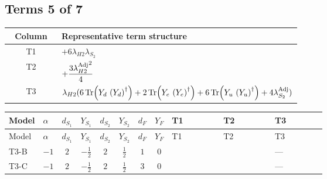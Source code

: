 \documentclass[8pt]{article}
\begin{document}
\begin{landscape}
\subsection*{Terms 5 of 7}
\begin{center}
\begin{tabular}{@{}c >{\raggedright\arraybackslash}p{0.82\linewidth}@{}}
\toprule
Column & Representative term structure \\
\midrule
T1 & \(\displaystyle +6 {\lambda_{H2}} {\lambda_{S_2}}\) \\
\midrule
T2 & \(\displaystyle +\frac{3 {\lambda_{H2}^{\rm Adj}}^2}{4}\) \\
\midrule
T3 & \(\displaystyle {\lambda_{H2}} (6 \operatorname{Tr}\!\left({Y_d}\,\left({Y_d}\right)^{\dagger}\right)+2 \operatorname{Tr}\!\left({Y_e}\,\left({Y_e}\right)^{\dagger}\right)+6 \operatorname{Tr}\!\left({Y_u}\,\left({Y_u}\right)^{\dagger}\right)+4 {\lambda_{S_2}^{\rm Adj}})\) \\
\midrule
\bottomrule
\end{tabular}
\end{center}
\smallskip
\tiny
\begin{longtable}{@{}llcccccc >{\raggedright\arraybackslash}p{0.21\linewidth} >{\raggedright\arraybackslash}p{0.21\linewidth} >{\raggedright\arraybackslash}p{0.21\linewidth}@{}}
\toprule
Model & $\alpha$ & $d_{S_1}$ & $Y_{S_1}$ & $d_{S_2}$ & $Y_{S_2}$ & $d_F$ & $Y_F$ & T1 & T2 & T3 \\
\midrule
\endfirsthead
\toprule
Model & $\alpha$ & $d_{S_1}$ & $Y_{S_1}$ & $d_{S_2}$ & $Y_{S_2}$ & $d_F$ & $Y_F$ & T1 & T2 & T3 \\
\midrule
\endhead
T3-B & $-1$ & $2$ & $-\frac{1}{2}$ & $2$ & $\frac{1}{2}$ & $1$ & $0$ & \scriptsize\adjustbox{max width=\linewidth}{$\begin{gathered} +6 {\lambda_{H2}} {\lambda_{S_2}}\end{gathered}$} & \scriptsize\adjustbox{max width=\linewidth}{$\begin{gathered} +\frac{3 {\lambda_{H2}^{\rm Adj}}^2}{4}\end{gathered}$} & --- \\
\midrule
T3-C & $-1$ & $2$ & $-\frac{1}{2}$ & $2$ & $\frac{1}{2}$ & $3$ & $0$ & \scriptsize\adjustbox{max width=\linewidth}{$\begin{gathered} +6 {\lambda_{H2}} {\lambda_{S_2}}\end{gathered}$} & \scriptsize\adjustbox{max width=\linewidth}{$\begin{gathered} +\frac{3 {\lambda_{H2}^{\rm Adj}}^2}{4}\end{gathered}$} & --- \\

\end{longtable}
\end{landscape}
\end{document}
